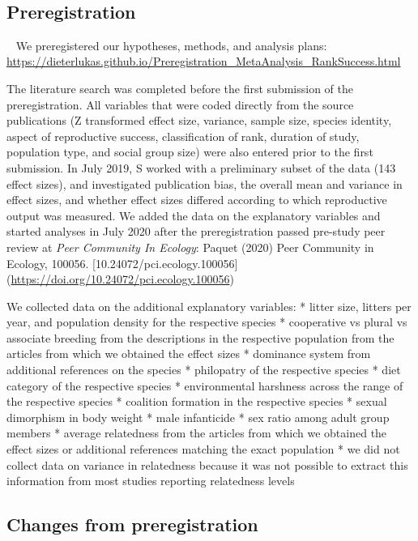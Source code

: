 \documentclass[
]{article}
\begin{document}
~

\hypertarget{preregistration}{%
\subsection{\texorpdfstring{\textbf{Preregistration}}{Preregistration}}\label{preregistration}}

~ We preregistered our hypotheses, methods, and analysis plans:
\url{https://dieterlukas.github.io/Preregistration_MetaAnalysis_RankSuccess.html}

The literature search was completed before the first submission of the
preregistration. All variables that were coded directly from the source
publications (Z transformed effect size, variance, sample size, species
identity, aspect of reproductive success, classification of rank,
duration of study, population type, and social group size) were also
entered prior to the first submission. In July 2019, S worked with a
preliminary subset of the data (143 effect sizes), and investigated
publication bias, the overall mean and variance in effect sizes, and
whether effect sizes differed according to which reproductive output was
measured. We added the data on the explanatory variables and started
analyses in July 2020 after the preregistration passed pre-study peer
review at \emph{Peer Community In Ecology}: Paquet (2020) Peer Community
in Ecology, 100056. {[}10.24072/pci.ecology.100056{]}
(\url{https://doi.org/10.24072/pci.ecology.100056})

We collected data on the additional explanatory variables: * litter
size, litters per year, and population density for the respective
species * cooperative vs plural vs associate breeding from the
descriptions in the respective population from the articles from which
we obtained the effect sizes * dominance system from additional
references on the species * philopatry of the respective species * diet
category of the respective species * environmental harshness across the
range of the respective species * coalition formation in the respective
species * sexual dimorphism in body weight * male infanticide * sex
ratio among adult group members * average relatedness from the articles
from which we obtained the effect sizes or additional references
matching the exact population * we did not collect data on variance in
relatedness because it was not possible to extract this information from
most studies reporting relatedness levels

\hypertarget{changes-from-preregistration}{%
\subsection{\texorpdfstring{\textbf{Changes from
preregistration}}{Changes from preregistration}}\label{changes-from-preregistration}}
\end{document}
